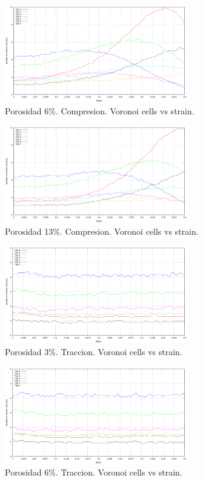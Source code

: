 \documentclass[10pt, oneside]{article} %
\begin{document}
\begin{figure}[H]
\centering
\includegraphics[width=8cm]{Figures/Porosidad_6_noVoronoi_strain.png}
\caption{Porosidad 6\%. Compresion. Voronoi cells vs strain.}
\end{figure}

\begin{figure}[H]
\centering
\includegraphics[width=8cm]{Figures/Porosidad_13_noVoronoi_strain.png}
\caption{Porosidad 13\%. Compresion. Voronoi cells vs strain.}
\end{figure}

\begin{figure}[H]
\centering
\includegraphics[width=8cm]{Figures/Porosidad_3_noVoronoi_strain_trac.png}
\caption{Porosidad 3\%. Traccion. Voronoi cells vs strain.}
\end{figure}

\begin{figure}[H]
\centering
\includegraphics[width=8cm]{Figures/Porosidad_6_noVoronoi_strain_trac.png}
\caption{Porosidad 6\%. Traccion. Voronoi cells vs strain.}
\end{figure}
\end{document}
